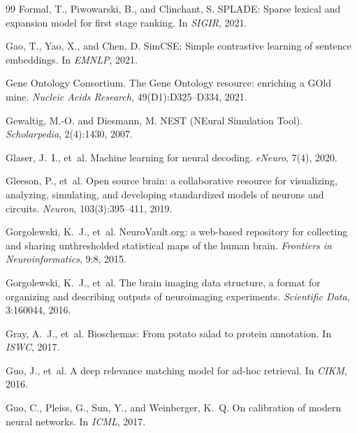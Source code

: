 \documentclass{article}
\theoremstyle{definition}
\begin{document}
\begin{thebibliography}{99}
Formal, T., Piwowarski, B., and Clinchant, S.
\newblock SPLADE: Sparse lexical and expansion model for first stage ranking.
\newblock In \emph{SIGIR}, 2021.

Gao, T., Yao, X., and Chen, D.
\newblock SimCSE: Simple contrastive learning of sentence embeddings.
\newblock In \emph{EMNLP}, 2021.

Gene Ontology Consortium.
\newblock The Gene Ontology resource: enriching a GOld mine.
\newblock \emph{Nucleic Acids Research}, 49(D1):D325--D334, 2021.

Gewaltig, M.-O. and Diesmann, M.
\newblock NEST (NEural Simulation Tool).
\newblock \emph{Scholarpedia}, 2(4):1430, 2007.

Glaser, J.~I., et~al.
\newblock Machine learning for neural decoding.
\newblock \emph{eNeuro}, 7(4), 2020.

Gleeson, P., et~al.
\newblock Open source brain: a collaborative resource for visualizing, analyzing, simulating, and developing standardized models of neurons and circuits.
\newblock \emph{Neuron}, 103(3):395--411, 2019.

Gorgolewski, K.~J., et~al.
\newblock NeuroVault.org: a web-based repository for collecting and sharing unthresholded statistical maps of the human brain.
\newblock \emph{Frontiers in Neuroinformatics}, 9:8, 2015.

Gorgolewski, K.~J., et~al.
\newblock The brain imaging data structure, a format for organizing and describing outputs of neuroimaging experiments.
\newblock \emph{Scientific Data}, 3:160044, 2016.

Gray, A.~J., et~al.
\newblock Bioschemas: From potato salad to protein annotation.
\newblock In \emph{ISWC}, 2017.

Guo, J., et~al.
\newblock A deep relevance matching model for ad-hoc retrieval.
\newblock In \emph{CIKM}, 2016.

Guo, C., Pleiss, G., Sun, Y., and Weinberger, K.~Q.
\newblock On calibration of modern neural networks.
\newblock In \emph{ICML}, 2017.


\end{thebibliography}
\end{document}
